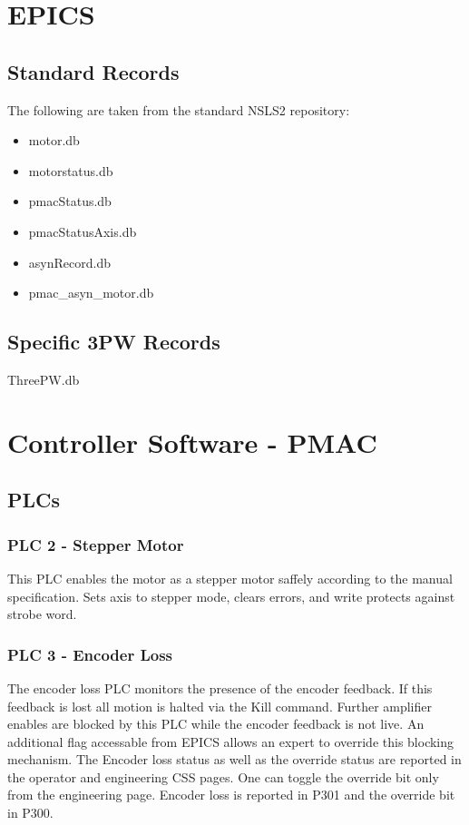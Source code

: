 \documentclass[12pt,letterpaper]{article}
\begin{document}
\section{EPICS}
\subsection{Standard Records}
The following are taken from the standard NSLS2 repository:
\begin{itemize}
\item motor.db
\item motorstatus.db
\item pmacStatus.db
\item pmacStatusAxis.db
\item asynRecord.db
\item pmac\_asyn\_motor.db
\end{itemize}


\subsection{Specific 3PW Records}
ThreePW.db






\section{Controller Software - PMAC}
\subsection{PLCs}
\subsubsection{PLC 2 - Stepper Motor}
This PLC enables the motor as a stepper motor saffely according to the manual specification.  Sets axis to stepper mode, clears errors, and write protects against strobe word.

\subsubsection{PLC 3 - Encoder Loss}
The encoder loss PLC monitors the presence of the encoder feedback.  If this feedback is lost all motion is halted via the Kill command.  Further amplifier enables are blocked by this PLC while the encoder feedback is not live.  An additional flag accessable from EPICS allows an expert to override this blocking mechanism.  The Encoder loss status as well as the override status are reported in the operator and engineering CSS pages.  One can toggle the override bit only from the engineering page.  Encoder loss is reported in P301 and the override bit in P300.
\end{document}
